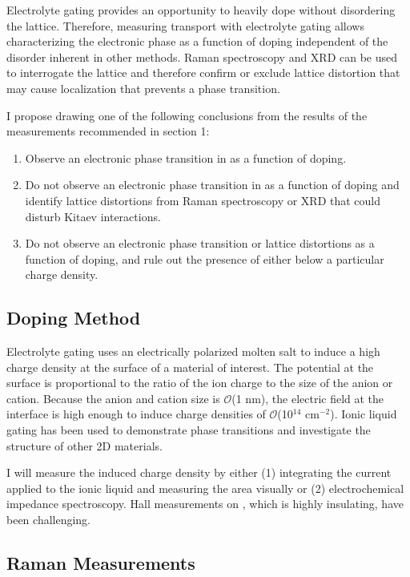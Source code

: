 \documentclass[11pt]{article}
\begin{document}
Electrolyte gating provides an opportunity to heavily dope \rucl without disordering the lattice. Therefore, measuring transport with electrolyte gating allows characterizing the electronic phase as a function of doping independent of the disorder inherent in other methods. Raman spectroscopy and XRD can be used to interrogate the lattice and therefore confirm or exclude lattice distortion that may cause localization that prevents a phase transition.

I propose drawing one of the following conclusions from the results of the measurements recommended in section 1:
\begin{enumerate}
	\item Observe an electronic phase transition in \rucl as a function of doping.
	\item Do not observe an electronic phase transition in \rucl as a function of doping and identify lattice distortions from Raman spectroscopy or XRD that could disturb Kitaev interactions.
	\item Do not observe an electronic phase transition or lattice distortions as a function of doping, and rule out the presence of either below a particular charge density.
\end{enumerate}
	

\subsection{Doping Method}

Electrolyte gating uses an electrically polarized molten salt to induce a high charge density at the surface of a material of interest. The potential at the surface is proportional to the ratio of the ion charge to the size of the anion or cation. Because the anion and cation size is $\mathcal{O}$(1 nm), the electric field at the interface is high enough to induce charge densities of $\mathcal{O}$(10$^{14}$ cm$^{-2}$). Ionic liquid gating has been used to demonstrate phase transitions and investigate the structure of other 2D materials\cite{Braga2012,Ueno2008}.

I will measure the induced charge density by either (1) integrating the current applied to the ionic liquid and measuring the area visually or (2) electrochemical impedance spectroscopy. Hall measurements on \ruclnospace, which is highly insulating, have been challenging.

\subsection{Raman Measurements}
\end{document}
